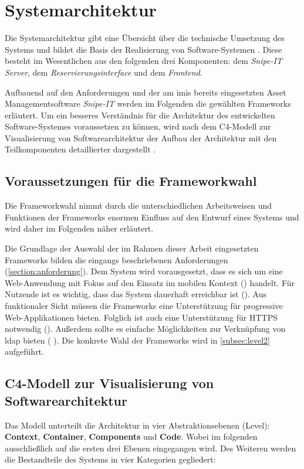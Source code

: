 \section{Systemarchitektur}
\label{section:architektur}
Die Systemarchitektur gibt eine Übersicht über die technische Umsetzung des
Systems und bildet die Basis der Realisierung von Software-Systemen
\cite{dumke_software-metriken_2000}. Diese besteht im Wesentlichen aus den
folgenden drei Komponenten: dem \textit{Snipe-IT Server}, dem
\textit{Reservierungsinterface} und dem \textit{Frontend}.

Aufbauend auf den Anforderungen und der am \ac{imis} bereits eingesetzten Asset Managementsoftware
\textit{Snipe-IT} werden im Folgenden die gewählten Frameworks erläutert. Um ein besseres
Verständnis für die Architektur des entwickelten Software-Systemes voraussetzen zu können, wird nach
dem C4-Modell zur Visualisierung von Softwarearchitektur der Aufbau der Architektur mit den
Teilkomponenten detaillierter dargestellt \cite{brown2013software}.

\subsection{Voraussetzungen für die Frameworkwahl}
\label{section:Frameworkwahl}
Die Frameworkwahl nimmt durch die unterschiedlichen Arbeitsweisen und Funktionen
der Frameworks enormen Einfluss auf den Entwurf eines Systems und wird daher im
Folgenden näher erläutert.

Die Grundlage der Auswahl der im Rahmen dieser Arbeit eingesetzten Frameworks bilden die eingangs
beschriebenen Anforderungen (\ref{section:anforderung}). Dem System wird vorausgesetzt, dass es sich
um eine Web-Anwendung mit Fokus auf den Einsatz im mobilen Kontext ()
handelt. Für Nutzende ist es wichtig, dass das System dauerhaft erreichbar ist (). Aus
funktionaler Sicht müssen die Frameworks eine Unterstützung für progressive Web-Applikationen
bieten. Folglich ist auch eine Unterstützung für HTTPS notwendig (). Außerdem sollte es
einfache Möglichkeiten zur Verknüpfung von \ac{ldap} bieten ( ). Die konkrete
Wahl der Frameworks wird in \ref{subsec:level2} aufgeführt.

\subsection{C4-Modell zur Visualisierung von Softwarearchitektur}
Das Modell unterteilt die Architektur in vier Abstraktionsebenen (Level):
\textbf{Context}, \textbf{Container}, \textbf{Components} und \textbf{Code}.
Wobei im folgenden ausschließlich auf die ersten drei Ebenen eingegangen wird.
Des Weiteren werden die Bestandteile des Systems in vier Kategorien gegliedert:

